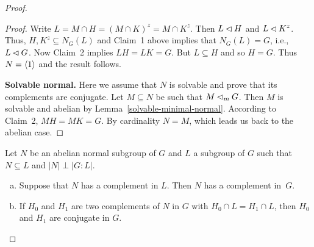 \begin{proof}
\begin{proof}
    Write $L=M\cap H=(M\cap K)^z=M\cap K^z$. Then $L\lhd H$ and $L\lhd K^z$. Thus, $H, K^z\subseteq N_G(L)$ and Claim~1 above implies that $N_G(L)=G$, i.e., $L\lhd G$. Now Claim~2 implies $LH=LK=G$. But $L\subseteq H$ and so $H=G$. Thus $N=\langle1\rangle$ and the result follows.
    
    
    \textbf{Solvable normal.} Here we assume that $N$ is solvable and prove that its complements are conjugate. Let $M\subseteq N$ be such that $M\lhd_m G$. Then $M$ is solvable and abelian by Lemma~\ref{solvable-minimal-normal}. According to Claim~2, $MH=MK=G$. By cardinality $N=M$, which leads us back to the abelian case.  \end{proof} 

\begin{thm}\label{gaschütz} {} Let\/ $N$ be an abelian normal subgroup of\/ $G$ and\/ $L$ a subgroup of\/ $G$ such that\/ $N\subseteq L$ and\/ $|N|\perp|G:L|$.
    \begin{enumerate}[a),font=\upshape]
    \item Suppose that\/ $N$ has a complement in\/ $L$. Then\/ $N$ has a complement in\/~$G$.
    \item If\/ $H_0$ and\/ $H_1$ are two complements of\/ $N$ in\/ $G$ with\/ $H_0 \cap L = H_1 \cap L$, then\/ $H_0$ and\/ $H_1$ are conjugate in\/ $G$.
    \end{enumerate}
\end{thm}


\end{proof}
